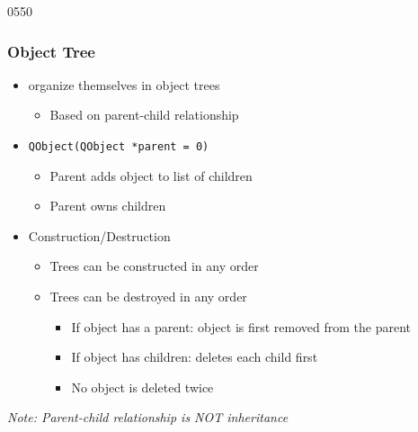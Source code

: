 \begin{slide}{0550} \label{parent_child} \frametitle{Object Tree}
\begin{itemize}
  \item {} organize themselves in object trees
    \begin{itemize}
    \item Based on parent-child relationship
    \end{itemize}\medskip

  \item \texttt{QObject(QObject *parent = 0)}
    \begin{itemize}
    \item Parent adds object to list of children
    \item Parent owns children
    \end{itemize}\medskip

  \item Construction/Destruction
    \begin{itemize}
    \item Trees can be constructed in any order
    \item Trees can be destroyed in any order
      \begin{itemize}
      \item If object has a parent: object is first removed from the parent
      \item If object has children: deletes each child first
      \item No object is deleted twice
      \end{itemize}
    \end{itemize}
 \end{itemize}
 \medskip
  \textit{Note: Parent-child relationship is NOT inheritance}
\end{slide}


